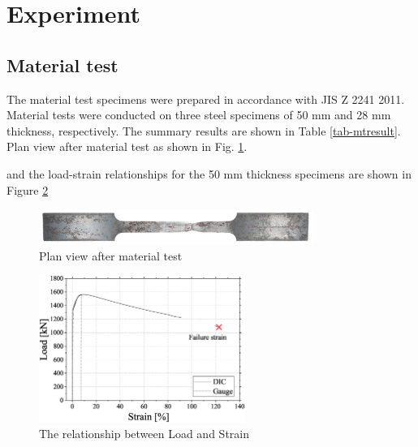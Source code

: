 \section{Experiment}
\subsection{Material test}
The material test specimens were prepared in accordance with JIS Z 2241 2011\cite{JIStest}. Material tests were conducted on three steel specimens of 50 mm and 28 mm thickness, respectively. The summary results are shown in Table \ref{tab-mtresult}. Plan view after material test as shown in Fig. \ref{fig-mt-1}. \par

and the load-strain relationships for the 50 mm thickness specimens are shown in Figure \ref{fig-mt50-ls}

\begin{figure}
    \centering
    \includegraphics[width=0.8\textwidth]{imgs/ch6/mt-1.jpg}
    \caption{Plan view after material test}
    \label{fig-mt-1}
\end{figure}

\begin{figure}[htbp]
    \centering
    \includegraphics[width=0.6\textwidth]{imgs/ch6/mt50-LS.eps}
    \caption{The relationship between Load and Strain}
    \label{fig-mt50-ls}
\end{figure}

